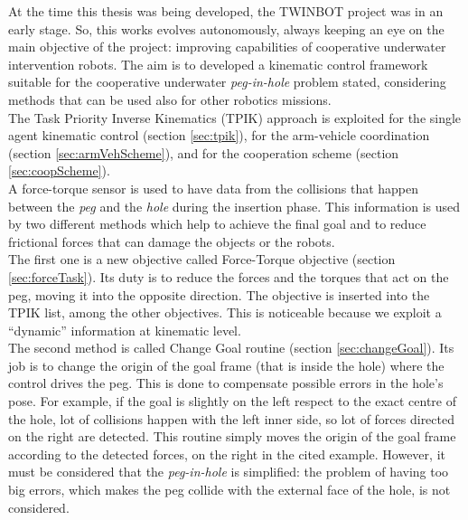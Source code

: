 At the time this thesis was being developed, the TWINBOT project was in an early stage. So, this works evolves autonomously, always keeping an eye on the main objective of the project: improving capabilities of cooperative underwater intervention robots. The aim  is to developed a kinematic control framework suitable for the cooperative underwater \textit{peg-in-hole} problem stated, considering methods that can be used also for other robotics missions.\\
The Task Priority Inverse Kinematics (TPIK) approach is exploited for the single agent kinematic control (section \ref{sec:tpik}), for the arm-vehicle coordination (section \ref{sec:armVehScheme}), and for the cooperation scheme (section \ref{sec:coopScheme}).\\
A force-torque sensor is used to have data from the collisions that happen between the \textit{peg} and the \textit{hole} during the insertion phase. This information is used by two different methods which help to achieve the final goal and to reduce frictional forces that can damage the objects or the robots.\\
The first one is a new objective called Force-Torque objective (section \ref{sec:forceTask}). Its duty is to reduce the forces and the torques that act on the peg, moving it into the opposite direction. The objective is inserted into the TPIK list, among the other objectives. This is noticeable because we exploit a \enquote{dynamic} information at kinematic level.\\
The second method is called Change Goal routine (section \ref{sec:changeGoal}). Its job is to change the origin of the goal frame (that is inside the hole) where the control drives the peg. This is done to compensate possible errors in the hole's pose. For example, if the goal is slightly on the left respect to the exact centre of the hole, lot of collisions happen with the left inner side, so lot of forces directed on the right are detected. This routine simply moves the origin of the goal frame according to the detected forces, on the right in the cited example. 
However, it must be considered that the \textit{peg-in-hole} is simplified: the problem of having too big errors, which makes the peg collide with the external face of the hole, is not considered.\\

